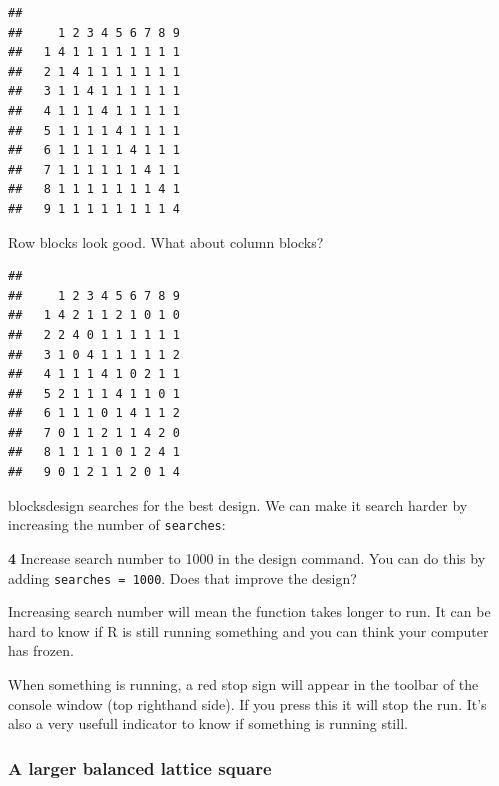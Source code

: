 \documentclass[
]{book}
\makeatletter
\newenvironment{Shaded}{\begin{snugshade}}{\end{snugshade}}
\newcommand{\FunctionTok}[1]{\textcolor[rgb]{0.00,0.00,0.00}{#1}}
\newcommand{\NormalTok}[1]{#1}
\newcommand{\SpecialCharTok}[1]{\textcolor[rgb]{0.00,0.00,0.00}{#1}}
\newenvironment{kframe}{%
\medskip{}
\setlength{\fboxsep}{.8em}
 \def\at@end@of@kframe{}%
 \ifinner\ifhmode%
  \def\at@end@of@kframe{\end{minipage}}%
  \begin{minipage}{\columnwidth}%
 \fi\fi%
 \def\FrameCommand##1{\hskip\@totalleftmargin \hskip-\fboxsep
 \colorbox{shadecolor}{##1}\hskip-\fboxsep
     \hskip-\linewidth \hskip-\@totalleftmargin \hskip\columnwidth}%
 \MakeFramed {\advance\hsize-\width
   \@totalleftmargin\z@ \linewidth\hsize
   \@setminipage}}%
 {\par\unskip\endMakeFramed%
 \at@end@of@kframe}
\newenvironment{rmdblock}[1]
  {
  \begin{itemize}
  \renewcommand{\labelitemi}{
    \raisebox{-.7\height}[0pt][0pt]{
      {\setkeys{Gin}{width=3em,keepaspectratio}\texttt{[image: images/\#1]}}
    }
  }
  \setlength{\fboxsep}{1em}
  \begin{kframe}
  \item
  }
  {
  \end{kframe}
  \end{itemize}
  }
\newenvironment{rmdnote}
  {\begin{rmdblock}{note}}
  {\end{rmdblock}}
\newenvironment{rmdquiz}
  {\begin{rmdblock}{quiz}}
  {\end{rmdblock}}
\makeatother
\begin{document}
\begin{verbatim}
##    
##     1 2 3 4 5 6 7 8 9
##   1 4 1 1 1 1 1 1 1 1
##   2 1 4 1 1 1 1 1 1 1
##   3 1 1 4 1 1 1 1 1 1
##   4 1 1 1 4 1 1 1 1 1
##   5 1 1 1 1 4 1 1 1 1
##   6 1 1 1 1 1 4 1 1 1
##   7 1 1 1 1 1 1 4 1 1
##   8 1 1 1 1 1 1 1 4 1
##   9 1 1 1 1 1 1 1 1 4
\end{verbatim}

Row blocks look good. What about column blocks?

\begin{Shaded}
\end{Shaded}

\begin{verbatim}
##    
##     1 2 3 4 5 6 7 8 9
##   1 4 2 1 1 2 1 0 1 0
##   2 2 4 0 1 1 1 1 1 1
##   3 1 0 4 1 1 1 1 1 2
##   4 1 1 1 4 1 0 2 1 1
##   5 2 1 1 1 4 1 1 0 1
##   6 1 1 1 0 1 4 1 1 2
##   7 0 1 1 2 1 1 4 2 0
##   8 1 1 1 1 0 1 2 4 1
##   9 0 1 2 1 1 2 0 1 4
\end{verbatim}

blocksdesign searches for the best design. We can make it search harder by increasing the number of \texttt{searches}:

\begin{rmdquiz}
\textbf{4} Increase search number to 1000 in the design command. You can do this by adding \texttt{searches\ =\ 1000}. Does that improve the design?
\end{rmdquiz}

\begin{rmdnote}
Increasing search number will mean the function takes longer to run. It can be hard to know if R is still running something and you can think your computer has frozen.

When something is running, a red stop sign will appear in the toolbar of the console window (top righthand side). If you press this it will stop the run. It's also a very usefull indicator to know if something is running still.
\end{rmdnote}

\hypertarget{a-larger-balanced-lattice-square}{%
\subsubsection{A larger balanced lattice square}\label{a-larger-balanced-lattice-square}}
\end{document}

